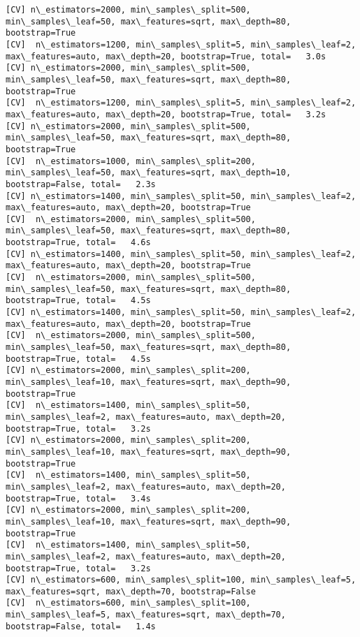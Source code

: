\documentclass[11pt]{article}
\begin{document}
\begin{Verbatim}[commandchars=\\\{\}]
[CV] n\_estimators=2000, min\_samples\_split=500, min\_samples\_leaf=50, max\_features=sqrt, max\_depth=80, bootstrap=True 
[CV]  n\_estimators=1200, min\_samples\_split=5, min\_samples\_leaf=2, max\_features=auto, max\_depth=20, bootstrap=True, total=   3.0s
[CV] n\_estimators=2000, min\_samples\_split=500, min\_samples\_leaf=50, max\_features=sqrt, max\_depth=80, bootstrap=True 
[CV]  n\_estimators=1200, min\_samples\_split=5, min\_samples\_leaf=2, max\_features=auto, max\_depth=20, bootstrap=True, total=   3.2s
[CV] n\_estimators=2000, min\_samples\_split=500, min\_samples\_leaf=50, max\_features=sqrt, max\_depth=80, bootstrap=True 
[CV]  n\_estimators=1000, min\_samples\_split=200, min\_samples\_leaf=50, max\_features=sqrt, max\_depth=10, bootstrap=False, total=   2.3s
[CV] n\_estimators=1400, min\_samples\_split=50, min\_samples\_leaf=2, max\_features=auto, max\_depth=20, bootstrap=True 
[CV]  n\_estimators=2000, min\_samples\_split=500, min\_samples\_leaf=50, max\_features=sqrt, max\_depth=80, bootstrap=True, total=   4.6s
[CV] n\_estimators=1400, min\_samples\_split=50, min\_samples\_leaf=2, max\_features=auto, max\_depth=20, bootstrap=True 
[CV]  n\_estimators=2000, min\_samples\_split=500, min\_samples\_leaf=50, max\_features=sqrt, max\_depth=80, bootstrap=True, total=   4.5s
[CV] n\_estimators=1400, min\_samples\_split=50, min\_samples\_leaf=2, max\_features=auto, max\_depth=20, bootstrap=True 
[CV]  n\_estimators=2000, min\_samples\_split=500, min\_samples\_leaf=50, max\_features=sqrt, max\_depth=80, bootstrap=True, total=   4.5s
[CV] n\_estimators=2000, min\_samples\_split=200, min\_samples\_leaf=10, max\_features=sqrt, max\_depth=90, bootstrap=True 
[CV]  n\_estimators=1400, min\_samples\_split=50, min\_samples\_leaf=2, max\_features=auto, max\_depth=20, bootstrap=True, total=   3.2s
[CV] n\_estimators=2000, min\_samples\_split=200, min\_samples\_leaf=10, max\_features=sqrt, max\_depth=90, bootstrap=True 
[CV]  n\_estimators=1400, min\_samples\_split=50, min\_samples\_leaf=2, max\_features=auto, max\_depth=20, bootstrap=True, total=   3.4s
[CV] n\_estimators=2000, min\_samples\_split=200, min\_samples\_leaf=10, max\_features=sqrt, max\_depth=90, bootstrap=True 
[CV]  n\_estimators=1400, min\_samples\_split=50, min\_samples\_leaf=2, max\_features=auto, max\_depth=20, bootstrap=True, total=   3.2s
[CV] n\_estimators=600, min\_samples\_split=100, min\_samples\_leaf=5, max\_features=sqrt, max\_depth=70, bootstrap=False 
[CV]  n\_estimators=600, min\_samples\_split=100, min\_samples\_leaf=5, max\_features=sqrt, max\_depth=70, bootstrap=False, total=   1.4s

\end{Verbatim}
\end{document}
